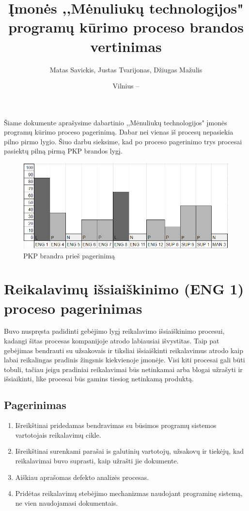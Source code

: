 \documentclass{VUMIFPSkursinis}
\title{Įmonės ,,Mėnuliukų technologijos" programų kūrimo proceso brandos vertinimas}
\author{Matas Savickis, Justas Tvarijonas, Džiugas Mažulis}
\date{Vilnius – \the\year}
\begin{document}
\maketitle

\tableofcontents

	Šiame dokumente aprašysime dabartinio ,,Mėnuliukų technologijos" įmonės programų kūrimo proceso pagerinimą. 
	Dabar nei vienas iš procesų  nepasiekia pilno pirmo lygio.
	Šiuo darbu sieksime, kad po proceso pagerinimo trys procesai pasiektų pilną pirmą PKP brandos lygį.
	\begin{figure}[htbp]
		\includegraphics[scale=1]{img/ProcPries}
		\caption{PKP brandra prieš pagerinimą} %
		\label{img:pkpPries}
	\end{figure}

\section{Reikalavimų išsiaiškinimo (ENG 1) proceso pagerinimas}

	Buvo nuspręsta padidinti gebėjimo lygį reikalavimo išsiaiškinimo procesui, kadangi šitas procesas kompanijoje atrodo labiausiai išvystitas.
	Taip pat gebėjimas bendrauti su užsakovais ir tiksliai išsiaiškinti reikalavimus atrodo kaip labai reikalingas pradinis žingsnis kiekvienoje įmonėje.
	Visi kiti procesai gali būti tobuli, tačiau jeigu pradiniai reikalavimai būs netinkamai arba blogai užrašyti ir išsiaikinti, like procesai būs gamins tiesiog netinkamą produktą.

\subsection{Pagerinimas}

	\begin{enumerate}
		\item{Išreikštinai pridedamas bendravimas su būsimos programų sistemos vartotojais reikalavimų cikle.}
		\item{Išreikštinai surenkami parašai is galutinių vartotojų, užsakovų ir tiekėjų, kad reikalavimai buvo suprasti, kaip užrašti jie dokumente.}
		\item{Aiškiau aprašomas defekto analizės procesas.}
		\item{Pridėtas reikalavimų stebėjimo mechanizmas naudojant programinę sistemą, ne vien naudojamasi dokumentais.}
	\end{enumerate}
\end{document}
